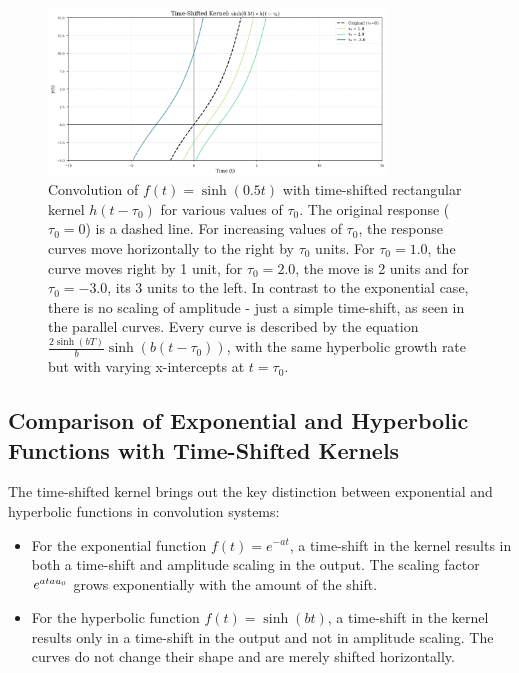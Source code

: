 \documentclass{article}
\begin{document}
	\begin{figure}[htbp]
		\centering
		\includegraphics[width=0.8\textwidth]{figs/hyper_time_shift_extended.png}
		\caption{Convolution of $f(t) = \sinh(0.5t)$ with time-shifted rectangular kernel $h(t-\tau_0)$ for various values of $\tau_0$. The original response ($\tau_0 = 0$) is a dashed line. For increasing values of $\tau_0$, the response curves move horizontally to the right by $\tau_0$ units. For $\tau_0 = 1.0$, the curve moves right by 1 unit, for $\tau_0 = 2.0$, the move is 2 units and for $\tau_0 = -3.0$, its 3 units to the left. In contrast to the exponential case, there is no scaling of amplitude - just a simple time-shift, as seen in the parallel curves. Every curve is described by the equation $\frac{2\sinh(bT)}{b}\sinh(b(t-\tau_0))$, with the same hyperbolic growth rate but with varying x-intercepts at $t = \tau_0$.}
	\end{figure}
	
	\subsection{Comparison of Exponential and Hyperbolic Functions with Time-Shifted Kernels}
	The time-shifted kernel brings out the key distinction between exponential and hyperbolic functions in convolution systems:
	
	
	\begin{itemize}
		\item For the exponential function $f(t) = e^{-at}$, a time-shift in the kernel results in both a time-shift and amplitude scaling in the output. The scaling factor $e^{a\\tau_0}$ grows exponentially with the amount of the shift.
		\item For the hyperbolic function $f(t) = \sinh(bt)$, a time-shift in the kernel results only in a time-shift in the output and not in amplitude scaling. The curves do not change their shape and are merely shifted horizontally.
	\end{itemize}
\end{document}
